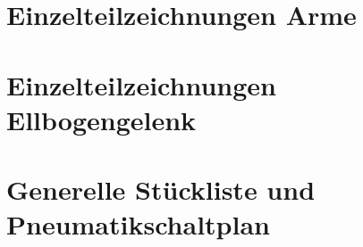 \section{Einzelteilzeichnungen Arme}\label{sec:einzelteilzeichnungen arme}
\newpage
\setlength{\voffset}{0cm}
\setlength{\hoffset}{0cm}









%
\newpage
\setlength{\voffset}{-2.5 cm}
\setlength{\hoffset}{-2 cm}
\section{Einzelteilzeichnungen Ellbogengelenk}\label{sec:einzelteilzeichnungen ellbogengelenk}
\newpage
\setlength{\voffset}{0cm}
\setlength{\hoffset}{0cm}


% 
\newpage
\setlength{\voffset}{-2.5 cm}
\setlength{\hoffset}{-2 cm}
\section{Generelle Stückliste und Pneumatikschaltplan}\label{sec:stueckliste und pneumatikschaltplan}
\newpage
\setlength{\voffset}{0 cm}
\setlength{\hoffset}{0 cm}




\newpage
\setlength{\voffset}{-2.5 cm}
\setlength{\hoffset}{-2 cm}